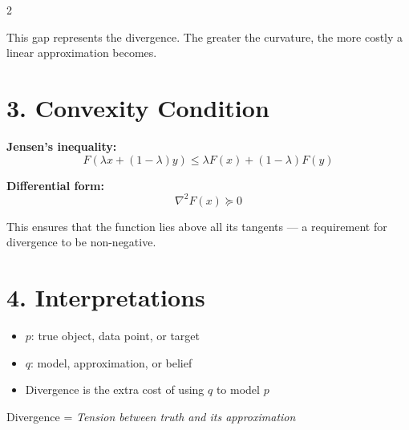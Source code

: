 \documentclass[11pt,a4paper]{article}
\begin{document}
\begin{multicols}{2}
\begin{center}
\end{center}

\vspace{0.3cm}
\noindent
This gap represents the divergence. The greater the curvature, the more costly a linear approximation becomes.

\section{3. Convexity Condition}

\textbf{Jensen's inequality:}
\[
F(\lambda x + (1-\lambda)y) \le \lambda F(x) + (1-\lambda) F(y)
\]

\textbf{Differential form:}
\[
\nabla^2 F(x) \succeq 0
\]

This ensures that the function lies above all its tangents — a requirement for divergence to be non-negative.

\section{4. Interpretations}

\begin{itemize}[leftmargin=0.5cm]
  \item \( p \): true object, data point, or target
  \item \( q \): model, approximation, or belief
  \item Divergence is the extra cost of using \( q \) to model \( p \)
\end{itemize}

\begin{tcolorbox}
Divergence = \emph{Tension between truth and its approximation}
\end{tcolorbox}


\end{multicols}
\end{document}
